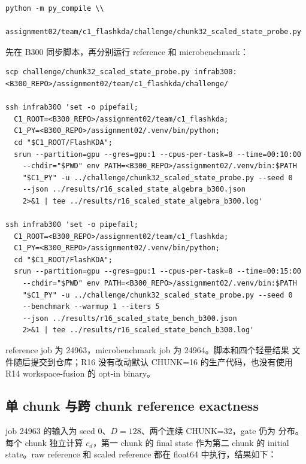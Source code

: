 \begin{lstlisting}
python -m py_compile \\
  assignment02/team/c1_flashkda/challenge/chunk32_scaled_state_probe.py
\end{lstlisting}

先在 B300 同步脚本，再分别运行 reference 和 microbenchmark：

\begin{lstlisting}
scp challenge/chunk32_scaled_state_probe.py infrab300:<B300_REPO>/assignment02/team/c1_flashkda/challenge/

ssh infrab300 'set -o pipefail;
  C1_ROOT=<B300_REPO>/assignment02/team/c1_flashkda;
  C1_PY=<B300_REPO>/assignment02/.venv/bin/python;
  cd "$C1_ROOT/FlashKDA";
  srun --partition=gpu --gres=gpu:1 --cpus-per-task=8 --time=00:10:00
    --chdir="$PWD" env PATH=<B300_REPO>/assignment02/.venv/bin:$PATH
    "$C1_PY" -u ../challenge/chunk32_scaled_state_probe.py --seed 0
    --json ../results/r16_scaled_state_algebra_b300.json
    2>&1 | tee ../results/r16_scaled_state_algebra_b300.log'

ssh infrab300 'set -o pipefail;
  C1_ROOT=<B300_REPO>/assignment02/team/c1_flashkda;
  C1_PY=<B300_REPO>/assignment02/.venv/bin/python;
  cd "$C1_ROOT/FlashKDA";
  srun --partition=gpu --gres=gpu:1 --cpus-per-task=8 --time=00:15:00
    --chdir="$PWD" env PATH=<B300_REPO>/assignment02/.venv/bin:$PATH
    "$C1_PY" -u ../challenge/chunk32_scaled_state_probe.py --seed 0
    --benchmark --warmup 1 --iters 5
    --json ../results/r16_scaled_state_bench_b300.json
    2>&1 | tee ../results/r16_scaled_state_bench_b300.log'
\end{lstlisting}

reference job 为 24963，microbenchmark job 为 24964。脚本和四个轻量结果
文件随后提交到仓库；R16 没有改动默认 CHUNK=16 的生产代码，也没有使用
R14 workspace-fusion 的 opt-in binary。

\subsection{单 chunk 与跨 chunk reference exactness}

job 24963 的输入为 seed 0、\(D=128\)、两个连续 CHUNK=32，gate 仍为
 分布。每个 chunk 独立计算 \(c_d\)，第一 chunk
的 final state 作为第二 chunk 的 initial state。raw reference 和 scaled
reference 都在 float64 中执行，结果如下：

